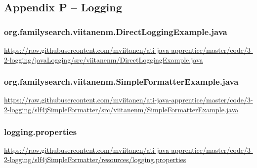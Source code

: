 \subsection*{Appendix P -- Logging} \label{App:AppendixP}
\subsubsection*{org.familysearch.viitanenm.DirectLoggingExample.java}
\noindent
\begin{minipage}{.6in}
\end{minipage}
\begin{minipage}{6in}
  \url{https://raw.githubusercontent.com/mviitanen/ati-java-apprentice/master/code/3-2-logging/javaLogging/src/viitanenm/DirectLoggingExample.java}
\end{minipage}

\vspace{1em}
\subsubsection*{org.familysearch.viitanenm.SimpleFormatterExample.java}
\noindent
\begin{minipage}{.6in}
\end{minipage}
\begin{minipage}{6in}
  \url{https://raw.githubusercontent.com/mviitanen/ati-java-apprentice/master/code/3-2-logging/slf4jSimpleFormatter/src/viitanenm/SimpleFormatterExample.java}
\end{minipage}

\vspace{1em}
\subsubsection*{logging.properties}
\noindent
\begin{minipage}{.6in}
\end{minipage}
\begin{minipage}{6in}
  \url{https://raw.githubusercontent.com/mviitanen/ati-java-apprentice/master/code/3-2-logging/slf4jSimpleFormatter/resources/logging.properties}
\end{minipage}

